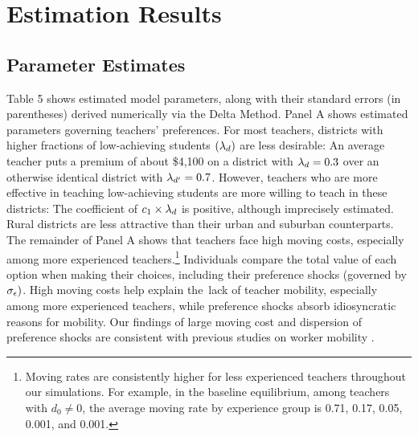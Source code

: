 \documentclass[notitlepage,12pt]{article}%
\begin{document}
\section{Estimation Results}

\subsection{Parameter Estimates}

Table 5 shows estimated model parameters, along with their standard errors (in
parentheses) derived numerically via the Delta Method. Panel A shows estimated
parameters governing teachers' preferences. For most teachers, districts with
higher fractions of low-achieving students $\left(  {\small \lambda}%
_{d}\right)  $ are less desirable: An average teacher puts a premium of about
\$4,100 on a district with ${\small \lambda}_{d}=0.3$ over an otherwise
identical district with ${\small \lambda}_{d^{\prime}}=0.7$. However, teachers
who are more effective in teaching low-achieving students are more willing to
teach in these districts: The coefficient of $c_{1}\times{\small \lambda}_{d}$
is positive, although imprecisely estimated. Rural districts are less
attractive than their urban and suburban counterparts. The remainder of Panel
A shows that teachers face high moving costs, especially among more
experienced teachers.\footnote{Moving rates are consistently higher for less
experienced teachers throughout our simulations. For example, in the baseline
equilibrium, among teachers with $d_{0}\neq0$, the average moving rate by
experience group is 0.71, 0.17, 0.05, 0.001, and 0.001.} Individuals compare
the total value of each option when making their choices, including their
preference shocks (governed by ${\small \sigma}_{\epsilon})$. High moving
costs help explain the\ lack of teacher mobility, especially among more
experienced teachers, while preference shocks absorb idiosyncratic reasons for
mobility. Our findings of large moving cost and dispersion of preference
shocks are consistent with previous studies on worker mobility \citep[e.g.,][]{kennan2011effect}.
\end{document}
